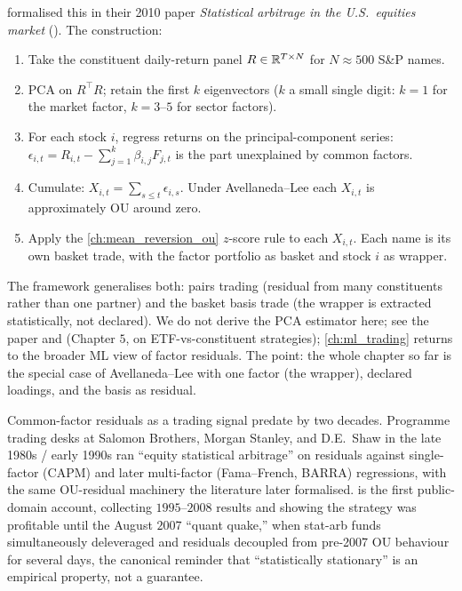 \citet{avellaneda2010stat} formalised this in their 2010 paper
\emph{Statistical arbitrage in the U.S.\ equities market}
(\citeAL). The construction:

\begin{enumerate}
  \item Take the constituent daily-return panel
  $R \in \mathbb{R}^{T\times N}$ for $N \approx 500$ S\&P names.
  \item PCA on $R^\top R$; retain the first $k$ eigenvectors
  ($k$ a small single digit: $k = 1$ for the market factor,
  $k = 3$--$5$ for sector factors).
  \item For each stock $i$, regress returns on the
  principal-component series:
  $\epsilon_{i,t} = R_{i,t} - \sum_{j=1}^k \beta_{i,j} F_{j,t}$ is
  the part unexplained by common factors.
  \item Cumulate: $X_{i,t} = \sum_{s\le t} \epsilon_{i,s}$.
  Under Avellaneda--Lee each $X_{i,t}$ is approximately OU around
  zero.
  \item Apply the \cref{ch:mean_reversion_ou} $z$-score rule to
  each $X_{i,t}$. Each name is its own basket trade, with the
  factor portfolio as basket and stock $i$ as wrapper.
\end{enumerate}

The framework generalises both: pairs trading (residual from many
constituents rather than one partner) and the basket basis trade
(the wrapper is extracted statistically, not declared). We do not
derive the PCA estimator here; see the paper and \citeChan{}
(Chapter $5$, on ETF-vs-constituent strategies);
\cref{ch:ml_trading} returns to the broader ML view of factor
residuals. The point: the whole chapter so far is the special
case of Avellaneda--Lee with one factor (the wrapper), declared
loadings, and the basis as residual.

\begin{historybox}
Common-factor residuals as a trading signal predate
\citet{avellaneda2010stat} by two decades. Programme trading desks
at Salomon Brothers, Morgan Stanley, and D.E.\ Shaw in the late
1980s / early 1990s ran ``equity statistical arbitrage'' on
residuals against single-factor (CAPM) and later multi-factor
(Fama--French, BARRA) regressions, with the same OU-residual
machinery the literature later formalised.
\citet{avellaneda2010stat} is the first public-domain account,
collecting $1995$--$2008$ results and showing the strategy was
profitable until the August $2007$ ``quant quake,'' when stat-arb
funds simultaneously deleveraged and residuals decoupled from
pre-2007 OU behaviour for several days, the canonical reminder
that ``statistically stationary'' is an empirical property, not a
guarantee.
\end{historybox}

